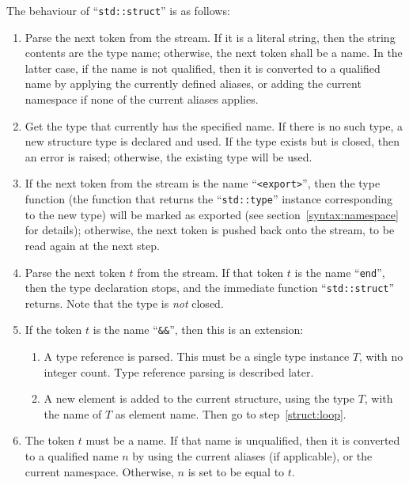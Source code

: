The behaviour of ``\verb|std::struct|'' is as follows:
\begin{enumerate}

    \item Parse the next token from the stream. If it is a literal
    string, then the string contents are the type name; otherwise, the
    next token shall be a name. In the latter case, if the name is not
    qualified, then it is converted to a qualified name by applying the
    currently defined aliases, or adding the current namespace if none
    of the current aliases applies.

    \item Get the type that currently has the specified name. If there
    is no such type, a new structure type is declared and used. If the
    type exists but is closed, then an error is raised; otherwise, the
    existing type will be used.

    \item If the next token from the stream is the name
    ``\verb|<export>|'', then the type function (the function that
    returns the ``\verb|std::type|'' instance corresponding to the new
    type) will be marked as exported (see section~\ref{syntax:namespace}
    for details); otherwise, the next token is pushed back onto the
    stream, to be read again at the next step.

    \item \label{struct:loop}Parse the next token $t$ from the stream. If
    that token $t$ is the name ``\verb|end|'', then the type declaration
    stops, and the immediate function ``\verb|std::struct|'' returns.
    Note that the type is \emph{not} closed.

    \item If the token $t$ is the name ``\verb|&&|'', then this is
    an extension:
    \begin{enumerate}

        \item A type reference is parsed. This must be a single type
        instance $T$, with no integer count. Type reference parsing is
        described later.

        \item A new element is added to the current structure, using the
        type $T$, with the name of $T$ as element name. Then go to
        step~\ref{struct:loop}.

    \end{enumerate}

    \item The token $t$ must be a name. If that name is unqualified,
    then it is converted to a qualified name $n$ by using the current
    aliases (if applicable), or the current namespace. Otherwise, $n$ is
    set to be equal to $t$.


\end{enumerate}
